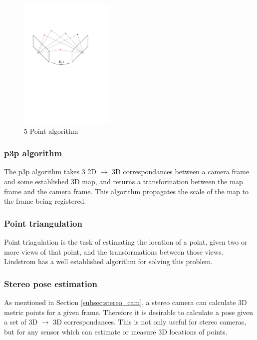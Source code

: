 \begin{figure}[h]
  \centering
    \includegraphics[width=0.4\textwidth]{chapters/images/5_point}
  \caption{5 Point algorithm}
  \label{fig:5_point}
\end{figure}

\subsubsection{p3p algorithm}
\label{subsec:p3p}
The p3p algorithm\cite{kneip_11} takes 3 2D $\rightarrow$ 3D correspondances between a camera frame and some established 3D map, and returns a transformation between the map frame and the camera frame.  This algorithm propagates the scale of the map to the frame being registered.

\subsubsection{Point triangulation}
\label{subsec:point_triangulation}

Point triagulation is the task of estimating the location of a point, given two or more views of that point, and the transformations between those views.  Lindstrom\cite{lindstrom_10} has a well established algorithm for solving this problem.

\subsubsection{Stereo pose estimation}
\label{subsec:horn}

As mentioned in Section \ref{subsec:stereo_cam}, a stereo camera can calculate 3D metric points for a given frame.  Therefore it is desirable to calculate a pose given a set of 3D $\rightarrow$ 3D correspondances.  This is not only useful for stereo cameras, but for any sensor which can estimate or measure 3D locations of points.

